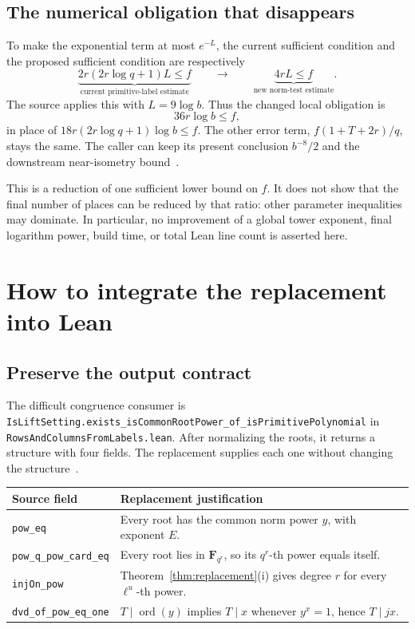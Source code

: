 \documentclass[11pt,a4paper]{article}
\newcommand{\F}{\mathbf F}
\newcommand{\ord}{\operatorname{ord}}
\newcommand{\src}[1]{\nolinkurl{#1}}
\theoremstyle{definition}
\theoremstyle{remark}
\begin{document}
\subsection{The numerical obligation that disappears}

To make the exponential term at most $e^{-L}$, the current sufficient
condition and the proposed sufficient condition are respectively
\begin{equation}
 \underbrace{2r(2r\log q+1)L\le f}_{\text{current primitive-label estimate}}
 \qquad\longrightarrow\qquad
 \underbrace{4rL\le f}_{\text{new norm-test estimate}}.
 \label{eq:f}
\end{equation}
The source applies this with $L=9\log b$. Thus the changed local
obligation is
\[
 36r\log b\le f,
\]
in place of $18r(2r\log q+1)\log b\le f$. The other error term,
$f(1+T+2r)/q$, stays the same. The caller can keep its present conclusion
$b^{-8}/2$ and the downstream near-isometry bound~\cite{spanning}.

This is a reduction of one sufficient lower bound on $f$. It does not
show that the final number of places can be reduced by that ratio:
other parameter inequalities may dominate. In particular, no improvement
of a global tower exponent, final logarithm power, build time, or total
Lean line count is asserted here.

\section{How to integrate the replacement into Lean}
\label{sec:integration}

\subsection{Preserve the output contract}

The difficult congruence consumer is
\src{IsLiftSetting.exists_isCommonRootPower_of_isPrimitivePolynomial}
in \src{RowsAndColumnsFromLabels.lean}. After normalizing the roots, it
returns a structure with four fields. The replacement supplies each one
without changing the structure~\cite{rows}.

\begin{center}
\small
\begin{tabularx}{\textwidth}{@{}p{}Y@{}}
\toprule
Source field & Replacement justification \\
\midrule
\src{pow_eq} & Every root has the common norm power $y$, with exponent $E$. \\
\src{pow_q_pow_card_eq} & Every root lies in $\F_{q^r}$, so its $q^r$-th power equals itself. \\
\src{injOn_pow} & Theorem~\ref{thm:replacement}(i) gives degree $r$ for every $\ell^u$-th power. \\
\src{dvd_of_pow_eq_one} & $T\mid\ord(y)$ implies $T\mid x$ whenever $y^x=1$, hence $T\mid jx$. \\
\bottomrule
\end{tabularx}
\end{center}
\end{document}
